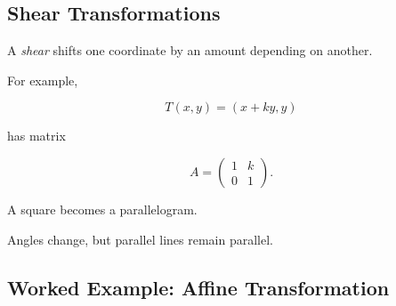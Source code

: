 \subsection{Shear Transformations}
\label{subsec:affine-shear}

A \emph{shear} shifts one coordinate by an amount depending on another.

For example,

\[
\boxed{
T(x,y)=(x+ky,y)
}
\]

has matrix

\[
A=
\begin{pmatrix}
1&k\\
0&1
\end{pmatrix}.
\]

A square becomes a parallelogram.

\begin{centereddiagram}
\end{centereddiagram}

Angles change, but parallel lines remain parallel.

\subsection{Worked Example: Affine Transformation}
\label{subsec:worked-affine-transformation}

